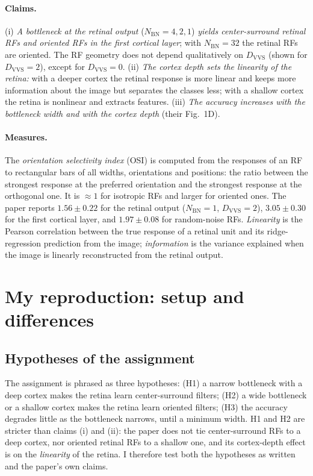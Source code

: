 \documentclass[11pt,a4paper]{article}
\newcommand{\NBN}{N_{\mathrm{BN}}}
\newcommand{\DVVS}{D_{\mathrm{VVS}}}
\begin{document}
\paragraph{Claims.} (i) \emph{A bottleneck at the retinal output} ($\NBN=4,2,1$) \emph{yields center-surround retinal RFs and oriented RFs in the first cortical layer}; with $\NBN=32$ the retinal RFs are oriented. The RF geometry does not depend qualitatively on $\DVVS$ (shown for $\DVVS=2$), except for $\DVVS=0$. (ii) \emph{The cortex depth sets the linearity of the retina:} with a deeper cortex the retinal response is more linear and keeps more information about the image but separates the classes less; with a shallow cortex the retina is nonlinear and extracts features. (iii) \emph{The accuracy increases with the bottleneck width and with the cortex depth} (their Fig.~1D).

\paragraph{Measures.} The \emph{orientation selectivity index} (OSI) is computed from the responses of an RF to rectangular bars of all widths, orientations and positions: the ratio between the strongest response at the preferred orientation and the strongest response at the orthogonal one. It is $\approx1$ for isotropic RFs and larger for oriented ones. The paper reports $1.56\pm0.22$ for the retinal output ($\NBN=1$, $\DVVS=2$), $3.05\pm0.30$ for the first cortical layer, and $1.97\pm0.08$ for random-noise RFs. \emph{Linearity} is the Pearson correlation between the true response of a retinal unit and its ridge-regression prediction from the image; \emph{information} is the variance explained when the image is linearly reconstructed from the retinal output.

\section{My reproduction: setup and differences}\label{sec:setup}
\subsection{Hypotheses of the assignment}
The assignment is phrased as three hypotheses: (H1) a narrow bottleneck with a deep cortex makes the retina learn center-surround filters; (H2) a wide bottleneck or a shallow cortex makes the retina learn oriented filters; (H3) the accuracy degrades little as the bottleneck narrows, until a minimum width. H1 and H2 are stricter than claims (i) and (ii): the paper does not tie center-surround RFs to a deep cortex, nor oriented retinal RFs to a shallow one, and its cortex-depth effect is on the \emph{linearity} of the retina. I therefore test both the hypotheses as written and the paper's own claims.
\end{document}
